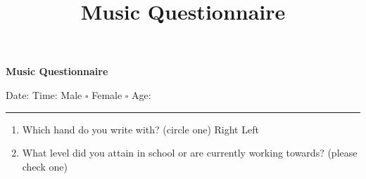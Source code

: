 \documentclass[12pt, a4paper]{article}
\title{Music Questionnaire}
\date{}
\author{}
\begin{document}
\begin{center}
\noindent\textbf{\Huge{Music Questionnaire}}
\end{center}
\begin{center}
\end{center}

\vspace{8pt}

\noindent Date: \hrulefill \hspace {2pt} Time:\hrulefill
\vspace{4pt}
\newline \noindent Male $\square$ \hspace{6pt}Female $\square$ \hspace{15pt} Age: \rule{3cm}{0.5pt}
\begin{enumerate}
\vspace{20pt}
\item Which hand do you write with? (circle one)\hspace{6pt} Right \hspace{6pt} Left
\vspace{6pt}
\item What level did you attain in school or are currently working towards? 
\newline (please check one)


\end{enumerate}
\end{document}
